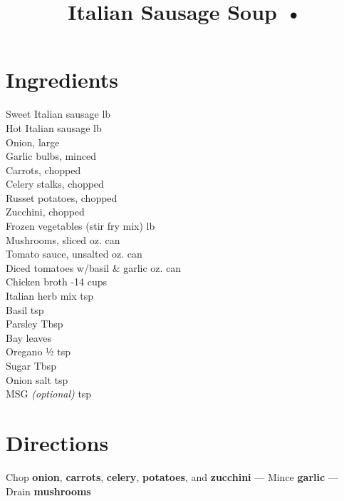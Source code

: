 \documentclass[11pt,letterpaper]{article}
\title{Italian Sausage Soup •}
\author{}
\date{}
\begin{document}
\maketitle
\thispagestyle{empty}

\section*{Ingredients}
\setlength{\columnsep}{20pt}
\begin{multicols}{2}
\noindent
    Sweet Italian sausage  lb \\
    Hot Italian sausage  lb \\
    Onion, large  \\
    Garlic bulbs, minced  \\
    Carrots, chopped  \\
    Celery stalks, chopped  \\
    Russet potatoes, chopped  \\
    Zucchini, chopped  \\
    Frozen vegetables (stir fry mix)  lb \\
    \columnbreak
    Mushrooms, sliced  oz. can \\
    Tomato sauce, unsalted  oz. can \\
    Diced tomatoes w/basil \& garlic  oz. can \\
    Chicken broth -14 cups \\
    Italian herb mix  tsp \\
    Basil  tsp \\
    Parsley  Tbsp \\
    Bay leaves  \\
    Oregano \dotfill ½ tsp \\
    Sugar  Tbsp \\
    Onion salt  tsp \\
    MSG \textit{(optional)}  tsp
\end{multicols}

\section*{Directions}

\noindent
Chop \textbf{onion}, \textbf{carrots}, \textbf{celery}, \textbf{potatoes}, and \textbf{zucchini} ---
Mince \textbf{garlic} ---
Drain \textbf{mushrooms}
\end{document}
